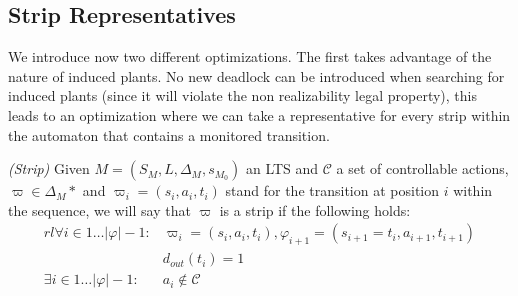 \subsection{Strip Representatives}
We introduce now two different optimizations.  The first
takes advantage of the nature of induced plants.  
No new deadlock can be introduced when searching for induced plants
(since it will violate the non realizability legal property), 
this leads to an optimization where we can take a representative 
for every strip within the
automaton that contains a monitored transition.

\begin{definition}\label{def:strip}\emph{(Strip)}
Given $M = (S_M, L, \Delta_M, s_{M_0})$ an LTS and 
$\mathcal{C}$ a set of controllable actions, 
$\varpi \in \Delta_M*$ and $\varpi_i = (s_i, a_i, t_i)$ stand for
the transition at position $i$ within the sequence, we will
say that $\varpi$ is a strip if the following holds: 
\[
\begin{matrix}{r l}
\forall i \in 1 \ldots |\varphi| - 1:& \varpi_i = (s_i,a_i,t_i), \varphi_{i+1} = (s_{i+1} = t_i, a_{i+1}, t_{i+1})\\
& d_{out}(t_i) = 1\\
\exists i \in 1 \ldots |\varphi| - 1: & a_i \not\in \mathcal{C}\\
\end{matrix}
\]
\end{definition}

